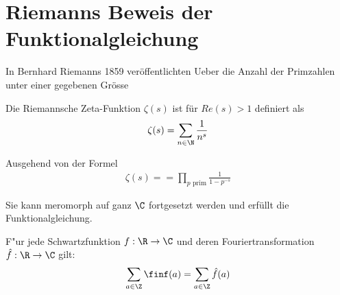 \section{Riemanns Beweis der Funktionalgleichung}
\label{sec:riemann2}
	In Bernhard Riemanns 1859 veröffentlichten \glqq Ueber die Anzahl der Primzahlen unter einer gegebenen Grösse\grqq
	
	\begin{defi}
		\label{def:zeta}
		Die Riemannsche Zeta-Funktion $\zeta(s)$  ist für $Re(s)>1$ definiert als
		\begin{align}
			\zeta (s) = \sum_{n\in \N} \frac{1}{n^s} 
		\end{align}
	\end{defi}
	Ausgehend von der Formel
	\begin{align*}
		\zeta (s) = = \prod_{p \text{ prim}} \frac{1}{1-p^{-s}}
	\end{align*}
	
	
	Sie kann meromorph auf ganz $\C$ fortgesetzt werden und erfüllt die Funktionalgleichung.






	\begin{satz}
		\label{satz:poisson}
		F"ur jede Schwartzfunktion $f:\R \to \C$ und deren Fouriertransformation $\hat{f}:\R \to \C$ gilt:
		\begin{align}
			\sum_{a \in \Z} \finf (a) = \sum_{a \in \Z} \hat{f}(a)
		\end{align}
	\end{satz}

